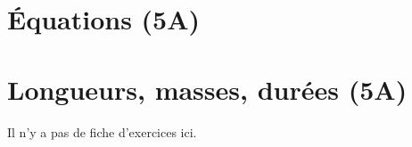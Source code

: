 \documentclass[a4paper,10pt]{article}
\begin{document}
\begin{multicols}{2}
\end{multicols}

\section{Équations (5A)}            %

\begin{multicols}{2}
\end{multicols}

\section{Longueurs, masses, durées (5A)}    %

Il n'y a pas de fiche d'exercices ici.
\end{document}
